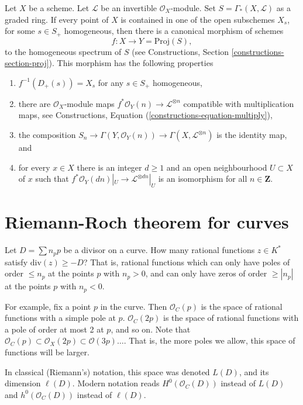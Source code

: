 \documentclass{book}
\begin{document}
\begin{lemma}
\label{lemma-map-into-proj}
Let $X$ be a scheme.
Let $\mathcal{L}$ be an invertible
$\mathcal{O}_X$-module.
Set $S = \Gamma_*(X, \mathcal{L})$ as a
graded ring.
If every point of $X$ is contained in one of
the
open subschemes $X_s$, for some $s \in S_{+}$
homogeneous, then
there is a canonical morphism of schemes
$$
f : X \longrightarrow Y = \text{Proj}(S),
$$
to the homogeneous spectrum of $S$ (see
Constructions, Section
\ref{constructions-section-proj}).
This morphism has the following properties
\begin{enumerate}
\item $f^{-1}(D_{+}(s)) = X_s$ for any $s \in
S_{+}$ homogeneous,
\item there are $\mathcal{O}_X$-module maps
$f^*\mathcal{O}_Y(n) \to \mathcal{L}^{\otimes
n}$
compatible with multiplication maps, see
Constructions, Equation
(\ref{constructions-equation-multiply}),
\item the composition
$S_n \to \Gamma(Y, \mathcal{O}_Y(n)) \to
\Gamma(X, \mathcal{L}^{\otimes n})$
is the identity map, and
\item for every $x \in X$ there is an integer
$d \geq 1$
and an open neighbourhood $U \subset X$ of
$x$
such that $f^*\mathcal{O}_Y(dn)|_U \to
\mathcal{L}^{\otimes dn}|_U$
is an isomorphism for all $n \in \mathbf{Z}$.
\end{enumerate}
\end{lemma}

\section{Riemann-Roch theorem for curves}
\label{section-riemann-roch}

\noindent
Let $D=\sum n_p p$ be a divisor on a curve.
How many rational functions $z \in K^*$
satisfy
$\text{div}(z) \geq -D$? That is, rational
functions
which can only have poles of order $\leq n_p$
at the points $p$ with $n_p>0$,
and can only have zeros of order $\geq
|n_p|$
at the points $p$ with $n_p<0$.

For example, fix a point $p$ in the curve.
Then $\mathcal{O}_C(p)$ is the space
of rational functions with a simple pole at
$p$.
$\mathcal{O}_C(2p)$ is the space of rational
functions
with a pole of order at most 2 at $p$, and so
on.
Note that $\mathcal{O}_C(p) \subset
\mathcal{O}_X (2p)
\subset \mathcal{O}(3p)…$.
That is, the more poles we allow, this space
of functions will be larger.

In classical (Riemann's) notation, this space
was denoted
$L(D)$, and its dimension $\ell(D)$.
Modern notation reads $H^0(\mathcal{O}_C(D))$
instead of $L(D)$ and
$h^0(\mathcal{O}_C(D))$
instead of $\ell(D)$.
\end{document}
